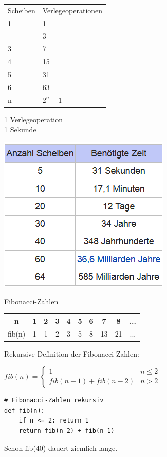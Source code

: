 \documentclass{beamer}
\begin{document}
\begin{frame}[fragile]
\begin{minipage}[t]{6cm}
\begin{tabular}{ll}
Scheiben & Verlegeoperationen\\
1  &  1 \\   \pause
2 &  3  \\
3 &   7 \\
4 & 15 \\
5 & 31 \\
6 & 63 \\
n &  \pause $2^n-1$  
\end{tabular}
\end{minipage} 
\begin{minipage}[t]{5cm}
1 Verlegeoperation = \\
1 Sekunde 

\includegraphics[scale=0.7]{Hanoi2.png}
\end{minipage}


\end{frame}

\begin{frame}[fragile]

Fibonacci-Zahlen

\begin{tabular}{|c|c|c|c|c|c|c|c|c|c|}
\hline n  & 1 & 2 & 3 & 4 & 5 & 6 & 7 & 8 &...\\
\hline fib(n)  & 1 & 1 & 2 & 3 & 5 & 8 & 13 & 21 & ...\\
\hline
\end{tabular} \pause

Rekursive Definition der Fibonacci-Zahlen:

$fib(n) =\begin{cases}
 1   &  n \le 2 \\
 fib(n-1) + fib(n-2) & n > 2 
\end{cases} $ \pause

\begin{lstlisting} 
# Fibonacci-Zahlen rekursiv
def fib(n):
    if n <= 2: return 1
    return fib(n-2) + fib(n-1)
\end{lstlisting} 

Schon fib(40) dauert ziemlich lange.
\end{frame}
\end{document}
